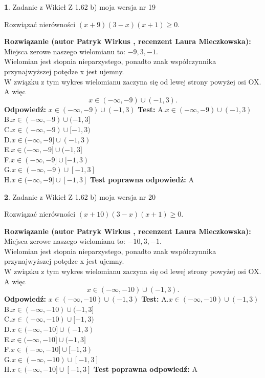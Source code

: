 \documentclass[12pt, a4paper]{article}
\theoremstyle{definition} %
\newtheorem{zad}{}
\newcommand{\zadStart}[1]{\begin{zad}#1\newline}
\newcommand{\zadStop}{\end{zad}}
\newcommand{\rozwStart}[2]{\noindent \textbf{Rozwiązanie (autor #1 , recenzent #2): }\newline}
\newcommand{\rozwStop}{\newline}
\newcommand{\odpStart}{\noindent \textbf{Odpowiedź:}\newline}
\newcommand{\odpStop}{\newline}
\newcommand{\testStart}{\noindent \textbf{Test:}\newline}
\newcommand{\testStop}{\newline}
\newcommand{\kluczStart}{\noindent \textbf{Test poprawna odpowiedź:}\newline}
\newcommand{\kluczStop}{\newline}
\begin{document}
\zadStart{Zadanie z Wikieł Z 1.62 b) moja wersja nr 19}

Rozwiązać nierówności $(x+9)(3-x)(x+1)\ge0$.
\zadStop
\rozwStart{Patryk Wirkus}{Laura Mieczkowska}
Miejsca zerowe naszego wielomianu to: $-9, 3, -1$.\\
Wielomian jest stopnia nieparzystego, ponadto znak współczynnika przy\linebreak najwyższej potędze x jest ujemny.\\ W związku z tym wykres wielomianu zaczyna się od lewej strony powyżej osi OX. A więc $$x \in (-\infty,-9) \cup (-1,3).$$
\rozwStop
\odpStart
$x \in (-\infty,-9) \cup (-1,3)$
\odpStop
\testStart
A.$x \in (-\infty,-9) \cup (-1,3)$\\
B.$x \in (-\infty,-9) \cup (-1,3]$\\
C.$x \in (-\infty,-9) \cup [-1,3)$\\
D.$x \in (-\infty,-9] \cup (-1,3)$\\
E.$x \in (-\infty,-9] \cup (-1,3]$\\
F.$x \in (-\infty,-9] \cup [-1,3)$\\
G.$x \in (-\infty,-9) \cup [-1,3]$\\
H.$x \in (-\infty,-9] \cup [-1,3]$
\testStop
\kluczStart
A
\kluczStop



\zadStart{Zadanie z Wikieł Z 1.62 b) moja wersja nr 20}

Rozwiązać nierówności $(x+10)(3-x)(x+1)\ge0$.
\zadStop
\rozwStart{Patryk Wirkus}{Laura Mieczkowska}
Miejsca zerowe naszego wielomianu to: $-10, 3, -1$.\\
Wielomian jest stopnia nieparzystego, ponadto znak współczynnika przy\linebreak najwyższej potędze x jest ujemny.\\ W związku z tym wykres wielomianu zaczyna się od lewej strony powyżej osi OX. A więc $$x \in (-\infty,-10) \cup (-1,3).$$
\rozwStop
\odpStart
$x \in (-\infty,-10) \cup (-1,3)$
\odpStop
\testStart
A.$x \in (-\infty,-10) \cup (-1,3)$\\
B.$x \in (-\infty,-10) \cup (-1,3]$\\
C.$x \in (-\infty,-10) \cup [-1,3)$\\
D.$x \in (-\infty,-10] \cup (-1,3)$\\
E.$x \in (-\infty,-10] \cup (-1,3]$\\
F.$x \in (-\infty,-10] \cup [-1,3)$\\
G.$x \in (-\infty,-10) \cup [-1,3]$\\
H.$x \in (-\infty,-10] \cup [-1,3]$
\testStop
\kluczStart
A
\kluczStop
\end{document}
